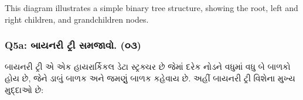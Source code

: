 \begin{Shaded}
\begin{Highlighting}[]
\end{Highlighting}
\end{Shaded}

This diagram illustrates a simple binary tree structure, showing the
root, left and right children, and grandchildren nodes.

\hypertarget{q5a-uxaacuxaafuxaa8uxab0-uxa9fuxab0-uxab8uxaaeuxa9cuxab5.-uxae6uxae9}{%
\subsubsection{Q5a: બાયનરી ટ્રી સમજાવો.
(૦૩)}\label{q5a-uxaacuxaafuxaa8uxab0-uxa9fuxab0-uxab8uxaaeuxa9cuxab5.-uxae6uxae9}}

બાયનરી ટ્રી એ એક હાયરાર્કિકલ ડેટા સ્ટ્રક્ચર છે જેમાં દરેક નોડને વધુમાં વધુ બે બાળકો હોય
છે, જેને ડાબું બાળક અને જમણું બાળક કહેવાય છે. અહીં બાયનરી ટ્રી વિશેના મુખ્ય મુદ્દાઓ છે:

